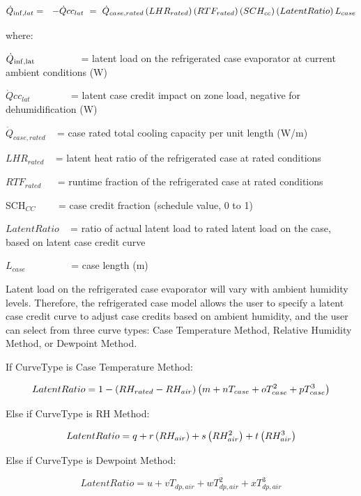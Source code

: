 \begin{equation}
{\dot Q_{{\rm{inf}},lat}} = \,\,\,\, - \dot Qc{c_{lat}}\,\, = \,\,{\dot Q_{case,rated}}\left( {LH{R_{rated}}} \right)\left( {RT{F_{rated}}} \right)\left( {SC{H_{cc}}} \right)\left( {LatentRatio} \right){L_{case}}
\end{equation}

where:

\({\dot Q_{{\rm{inf,lat}}}}\) ~~~~~~~~ = latent load on the refrigerated case evaporator at current ambient conditions (W)

\(\dot Qc{c_{lat}}\) ~~~~~~~ = latent case credit impact on zone load, negative for dehumidification (W)

\({\dot Q_{case,rated}}\) ~ = case rated total cooling capacity per unit length (W/m)

\(LH{R_{rated}}\) ~ = latent heat ratio of the refrigerated case at rated conditions

\(RT{F_{rated}}\) ~~ = runtime fraction of the refrigerated case at rated conditions

SCH\(_{CC}\)~~~~ = case credit fraction (schedule value, 0 to 1)

\(LatentRatio\) ~ = ratio of actual latent load to rated latent load on the case, based on latent case credit curve

\({L_{case}}\) ~~~~~~~~ = case length (m)

Latent load on the refrigerated case evaporator will vary with ambient humidity levels. Therefore, the refrigerated case model allows the user to specify a latent case credit curve to adjust case credits based on ambient humidity, and the user can select from three curve types: Case Temperature Method, Relative Humidity Method, or Dewpoint Method.

If CurveType is Case Temperature Method:

\begin{equation}
  LatentRatio = 1-\left(RH_{rated}-RH_{air}\right)\left(m+nT_{case}+oT_{case}^2+pT_{case}^3\right)
\end{equation}

Else if CurveType is RH Method:

\begin{equation}
  LatentRatio = q + r\left(RH_{air}\right) + s\left(RH_{air}^2\right) + t\left(RH_{air}^3\right)
\end{equation}

Else if CurveType is Dewpoint Method:

\begin{equation}
  LatentRatio = u + vT_{dp,air} + wT_{dp,air}^2 + xT_{dp,air}^3
\end{equation}

